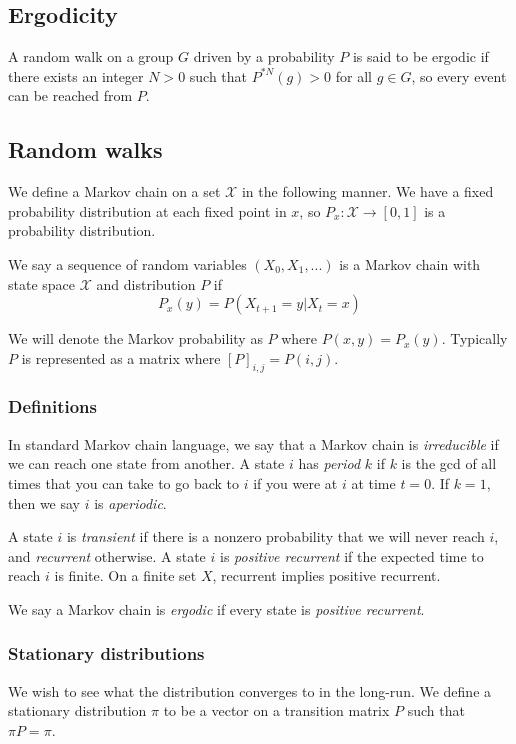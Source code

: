 \documentclass[]{article}
\theoremstyle{definition}
\numberwithin{theorem}{section}
\numberwithin{equation}{section}
\begin{document}
\subsection{Ergodicity}
A random walk on a group $G$ driven by a probability $P$ is said to be ergodic if there exists an integer $N > 0$ such that $P^{\ast N}(g) > 0$ for all $g \in G$, so every event can be reached from $P$. 

\subsection{Random walks}
We define a Markov chain on a set $\mathcal{X}$ in the following manner. We have a fixed probability distribution at each fixed point in $x$, so $P_x : \mathcal{X} \rightarrow [0, 1]$ is a probability distribution. 

We say a sequence of random variables $(X_0, X_1, ...)$ is a Markov chain with state space $\mathcal{X}$ and distribution $P$ if 
\begin{equation}
	P_x(y) = P(X_{t + 1} = y | X_t = x)
\end{equation}

We will denote the Markov probability as $P$ where $P(x, y) = P_x(y)$. Typically $P$ is represented as a matrix where $[P]_{i,j} = P(i, j)$. 

\subsubsection{Definitions}
In standard Markov chain language, we say that a Markov chain is \textit{irreducible} if we can reach one state from another. A state $i$ has \textit{period} $k$ if $k$ is the gcd of all times that you can take to go back to $i$ if you were at $i$ at time $t = 0$. If $k = 1$, then we say $i$ is \textit{aperiodic}. 

A state $i$ is \textit{transient} if there is a nonzero probability that we will never reach $i$, and \textit{recurrent} otherwise. A state $i$ is \textit{positive recurrent} if the expected time to reach $i$ is finite. On a finite set $X$, recurrent implies positive recurrent. 

We say a Markov chain is \textit{ergodic} if every state is \textit{positive recurrent}. 
\subsubsection{Stationary distributions}
We wish to see what the distribution converges to in the long-run. We define a stationary distribution $\pi$ to be a vector on a transition matrix $P$ such that $\pi P = \pi$. 
\end{document}
